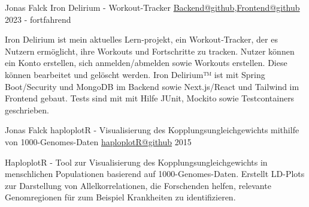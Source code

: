 \begin{cventries}
  \cventry
    {Jonas Falck} %
    {Iron Delirium - Workout‑Tracker} %
    {\href{https://github.com/joe-nas/workout-app}{Backend@github},\href{https://github.com/joe-nas/workout-app-frontend-next}{Frontend@github}} %
    {2023 - fortfahrend} %
    {
      \begin{cvitems} %
        \item {Iron Delirium ist mein aktuelles Lern-projekt, ein Workout‑Tracker, der es Nutzern ermöglicht, ihre Workouts und Fortschritte zu tracken. Nutzer
        können ein Konto erstellen, sich anmelden/abmelden sowie Workouts erstellen. Diese können bearbeitet und gelöscht werden. Iron Delirium™
        ist mit Spring Boot/Security und MongoDB im Backend sowie Next.js/React und Tailwind im Frontend gebaut. Tests sind mit mit Hilfe JUnit,
        Mockito sowie Testcontainers geschrieben.}
        \vspace{0.2cm}
        \newline{}   
            
         
      \end{cvitems}
    }

  \cventry
    {Jonas Falck} %
    {haploplotR - Visualisierung des Kopplungsungleichgewichts mithilfe von 1000-Genomes-Daten} %
    {\href{https://github.com/joe-nas/haploplotR}{haploplotR@github}} %
    {2015} %
    {
      \begin{cvitems} %
        \item {HaploplotR - Tool zur Visualisierung des Kopplungsungleichgewichts in menschlichen Populationen basierend auf 1000-Genomes-Daten. 
        Erstellt LD-Plots zur Darstellung von Allelkorrelationen, die Forschenden helfen, relevante Genomregionen für zum Beispiel Krankheiten zu identifizieren.}
        \vspace{0.2cm}
        \newline{}   
      \end{cvitems}
    }
\end{cventries}
